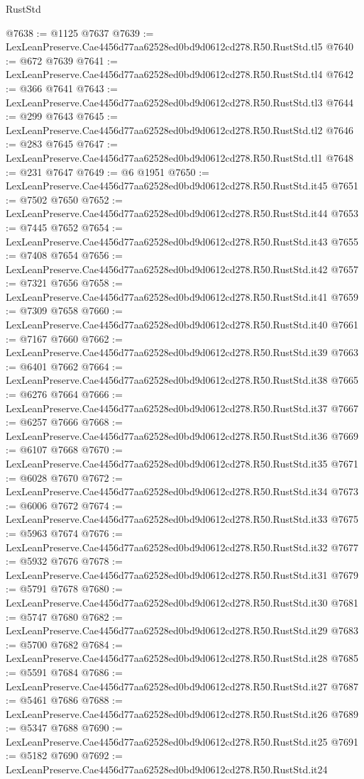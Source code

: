 \begin{lexlean}{RustStd}
\begin{coremodule}
@7638 := @1125 @7637
@7639 := LexLeanPreserve.Cae4456d77aa62528ed0bd9d0612cd278.R50.RustStd.tl5
@7640 := @672 @7639
@7641 := LexLeanPreserve.Cae4456d77aa62528ed0bd9d0612cd278.R50.RustStd.tl4
@7642 := @366 @7641
@7643 := LexLeanPreserve.Cae4456d77aa62528ed0bd9d0612cd278.R50.RustStd.tl3
@7644 := @299 @7643
@7645 := LexLeanPreserve.Cae4456d77aa62528ed0bd9d0612cd278.R50.RustStd.tl2
@7646 := @283 @7645
@7647 := LexLeanPreserve.Cae4456d77aa62528ed0bd9d0612cd278.R50.RustStd.tl1
@7648 := @231 @7647
@7649 := @6 @1951
@7650 := LexLeanPreserve.Cae4456d77aa62528ed0bd9d0612cd278.R50.RustStd.it45
@7651 := @7502 @7650
@7652 := LexLeanPreserve.Cae4456d77aa62528ed0bd9d0612cd278.R50.RustStd.it44
@7653 := @7445 @7652
@7654 := LexLeanPreserve.Cae4456d77aa62528ed0bd9d0612cd278.R50.RustStd.it43
@7655 := @7408 @7654
@7656 := LexLeanPreserve.Cae4456d77aa62528ed0bd9d0612cd278.R50.RustStd.it42
@7657 := @7321 @7656
@7658 := LexLeanPreserve.Cae4456d77aa62528ed0bd9d0612cd278.R50.RustStd.it41
@7659 := @7309 @7658
@7660 := LexLeanPreserve.Cae4456d77aa62528ed0bd9d0612cd278.R50.RustStd.it40
@7661 := @7167 @7660
@7662 := LexLeanPreserve.Cae4456d77aa62528ed0bd9d0612cd278.R50.RustStd.it39
@7663 := @6401 @7662
@7664 := LexLeanPreserve.Cae4456d77aa62528ed0bd9d0612cd278.R50.RustStd.it38
@7665 := @6276 @7664
@7666 := LexLeanPreserve.Cae4456d77aa62528ed0bd9d0612cd278.R50.RustStd.it37
@7667 := @6257 @7666
@7668 := LexLeanPreserve.Cae4456d77aa62528ed0bd9d0612cd278.R50.RustStd.it36
@7669 := @6107 @7668
@7670 := LexLeanPreserve.Cae4456d77aa62528ed0bd9d0612cd278.R50.RustStd.it35
@7671 := @6028 @7670
@7672 := LexLeanPreserve.Cae4456d77aa62528ed0bd9d0612cd278.R50.RustStd.it34
@7673 := @6006 @7672
@7674 := LexLeanPreserve.Cae4456d77aa62528ed0bd9d0612cd278.R50.RustStd.it33
@7675 := @5963 @7674
@7676 := LexLeanPreserve.Cae4456d77aa62528ed0bd9d0612cd278.R50.RustStd.it32
@7677 := @5932 @7676
@7678 := LexLeanPreserve.Cae4456d77aa62528ed0bd9d0612cd278.R50.RustStd.it31
@7679 := @5791 @7678
@7680 := LexLeanPreserve.Cae4456d77aa62528ed0bd9d0612cd278.R50.RustStd.it30
@7681 := @5747 @7680
@7682 := LexLeanPreserve.Cae4456d77aa62528ed0bd9d0612cd278.R50.RustStd.it29
@7683 := @5700 @7682
@7684 := LexLeanPreserve.Cae4456d77aa62528ed0bd9d0612cd278.R50.RustStd.it28
@7685 := @5591 @7684
@7686 := LexLeanPreserve.Cae4456d77aa62528ed0bd9d0612cd278.R50.RustStd.it27
@7687 := @5461 @7686
@7688 := LexLeanPreserve.Cae4456d77aa62528ed0bd9d0612cd278.R50.RustStd.it26
@7689 := @5347 @7688
@7690 := LexLeanPreserve.Cae4456d77aa62528ed0bd9d0612cd278.R50.RustStd.it25
@7691 := @5182 @7690
@7692 := LexLeanPreserve.Cae4456d77aa62528ed0bd9d0612cd278.R50.RustStd.it24

\end{coremodule}
\end{lexlean}
